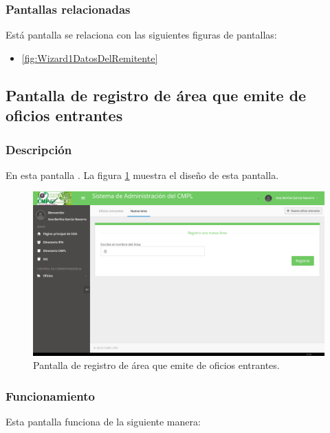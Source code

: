 \subsubsection{Pantallas relacionadas}
Está pantalla se relaciona con las siguientes figuras de pantallas:
	\begin{itemize}
		\item \ref{fig:Wizard1DatosDelRemitente}
	\end{itemize}

\subsection{Pantalla de registro de área que emite de oficios entrantes}
\subsubsection{Descripción}
	En esta pantalla . La figura \ref{fig:NuevaAreaEmisor} muestra el diseño de esta pantalla.		
		
	\begin{figure}[htbp!]
		\centering
			\includegraphics[width=1\textwidth]{Pantallas/NuevaAreaEmisor.png}
		\caption{Pantalla de registro de área que emite de oficios entrantes.}
		\label{fig:NuevaAreaEmisor}
	\end{figure}

\subsubsection{Funcionamiento}
	Esta pantalla funciona de la siguiente manera:
	
